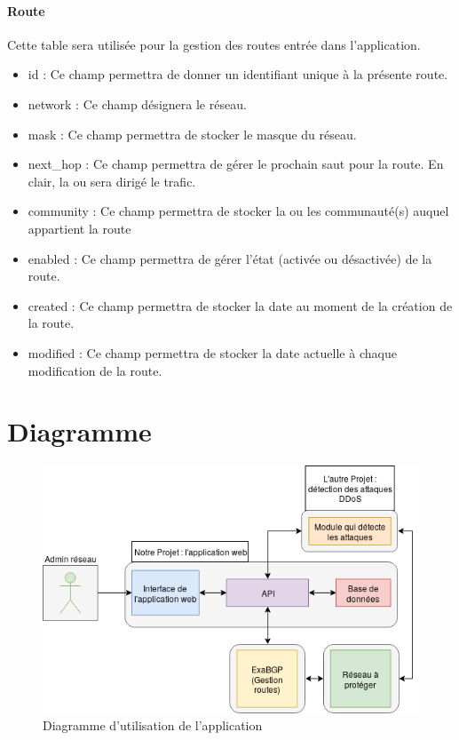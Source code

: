 \paragraph{Route} Cette table sera utilisée pour la gestion des routes entrée dans l'application.
\begin{itemize}
    \item id : Ce champ permettra de donner un identifiant unique à la présente route.
    \item network : Ce champ désignera le réseau.
    \item mask : Ce champ permettra de stocker le masque du réseau.
    \item next\_hop : Ce champ permettra de gérer le prochain saut pour la route. En clair, la ou sera dirigé le trafic.
    \item community : Ce champ permettra de stocker la ou les communauté(s) auquel appartient la route
    \item enabled : Ce champ permettra de gérer l'état (activée ou désactivée) de la route.
    \item created : Ce champ permettra de stocker la date au moment de la création de la route.
    \item modified : Ce champ permettra de stocker la date actuelle à chaque modification de la route.
\end{itemize}

\section{Diagramme}

\begin{figure}[H]
    \includegraphics[width=\textwidth]{./medias/use_cases.png}
    \caption{Diagramme d'utilisation de l'application}
    \label{fig:use_cases}
\end{figure}

